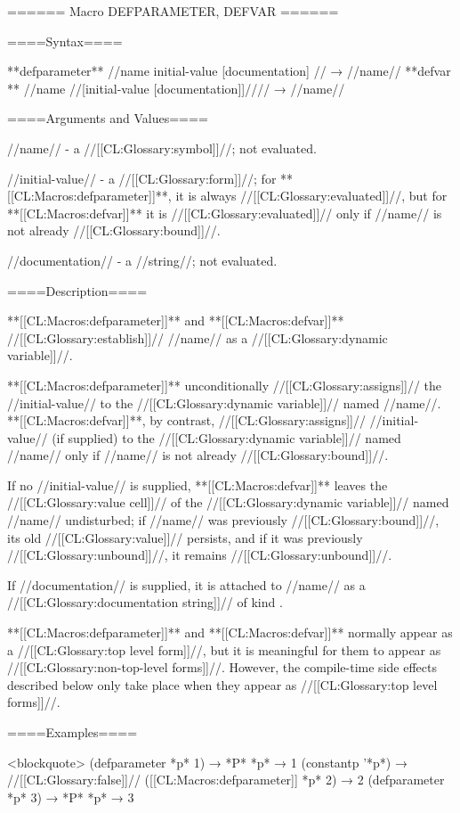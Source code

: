 ====== Macro DEFPARAMETER, DEFVAR ======

====Syntax====

**defparameter** //name initial-value [documentation] // → //name// **defvar ** //name //[initial-value [documentation]]//// → //name//

====Arguments and Values====

//name// - a //[[CL:Glossary:symbol]]//; not evaluated.

//initial-value// - a //[[CL:Glossary:form]]//; for **[[CL:Macros:defparameter]]**, it is always //[[CL:Glossary:evaluated]]//, but for **[[CL:Macros:defvar]]** it is //[[CL:Glossary:evaluated]]// only if //name// is not already //[[CL:Glossary:bound]]//.

//documentation// - a //string//; not evaluated.

====Description====

**[[CL:Macros:defparameter]]** and **[[CL:Macros:defvar]]** //[[CL:Glossary:establish]]// //name// as a //[[CL:Glossary:dynamic variable]]//.

**[[CL:Macros:defparameter]]** unconditionally //[[CL:Glossary:assigns]]// the //initial-value// to the //[[CL:Glossary:dynamic variable]]// named //name//. **[[CL:Macros:defvar]]**, by contrast, //[[CL:Glossary:assigns]]// //initial-value// (if supplied) to the //[[CL:Glossary:dynamic variable]]// named //name// only if //name// is not already //[[CL:Glossary:bound]]//.

If no //initial-value// is supplied, **[[CL:Macros:defvar]]** leaves the //[[CL:Glossary:value cell]]// of the //[[CL:Glossary:dynamic variable]]// named //name// undisturbed; if //name// was previously //[[CL:Glossary:bound]]//, its old //[[CL:Glossary:value]]// persists, and if it was previously //[[CL:Glossary:unbound]]//, it remains //[[CL:Glossary:unbound]]//.

If //documentation// is supplied, it is attached to //name// as a //[[CL:Glossary:documentation string]]// of kind .

**[[CL:Macros:defparameter]]** and **[[CL:Macros:defvar]]** normally appear as a //[[CL:Glossary:top level form]]//, but it is meaningful for them to appear as //[[CL:Glossary:non-top-level forms]]//. However, the compile-time side effects described below only take place when they appear as //[[CL:Glossary:top level forms]]//.

====Examples====

<blockquote> (defparameter *p* 1) → *P* *p* → 1 (constantp '*p*) → //[[CL:Glossary:false]]// ([[CL:Macros:defparameter]] *p* 2) → 2 (defparameter *p* 3) → *P* *p* → 3

